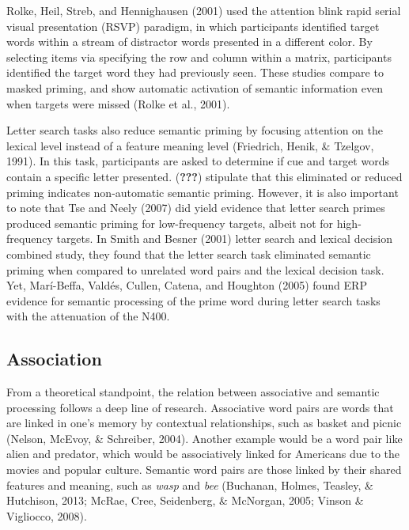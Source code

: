 \documentclass[english,man]{apa6}
\theoremstyle{definition}
\theoremstyle{definition}
\theoremstyle{definition}
\theoremstyle{remark}
\begin{document}
Rolke, Heil, Streb, and Hennighausen (2001) used the attention blink
rapid serial visual presentation (RSVP) paradigm, in which participants
identified target words within a stream of distractor words presented in
a different color. By selecting items via specifying the row and column
within a matrix, participants identified the target word they had
previously seen. These studies compare to masked priming, and show
automatic activation of semantic information even when targets were
missed (Rolke et al., 2001).

Letter search tasks also reduce semantic priming by focusing attention
on the lexical level instead of a feature meaning level (Friedrich,
Henik, \& Tzelgov, 1991). In this task, participants are asked to
determine if cue and target words contain a specific letter presented.
({\textbf{???}}) stipulate that this eliminated or reduced priming
indicates non-automatic semantic priming. However, it is also important
to note that Tse and Neely (2007) did yield evidence that letter search
primes produced semantic priming for low-frequency targets, albeit not
for high-frequency targets. In Smith and Besner (2001) letter search and
lexical decision combined study, they found that the letter search task
eliminated semantic priming when compared to unrelated word pairs and
the lexical decision task. Yet, Marí-Beffa, Valdés, Cullen, Catena, and
Houghton (2005) found ERP evidence for semantic processing of the prime
word during letter search tasks with the attenuation of the N400.

\subsection{Association}\label{association}

From a theoretical standpoint, the relation between associative and
semantic processing follows a deep line of research. Associative word
pairs are words that are linked in one's memory by contextual
relationships, such as basket and picnic (Nelson, McEvoy, \& Schreiber,
2004). Another example would be a word pair like alien and predator,
which would be associatively linked for Americans due to the movies and
popular culture. Semantic word pairs are those linked by their shared
features and meaning, such as \emph{wasp} and \emph{bee} (Buchanan,
Holmes, Teasley, \& Hutchison, 2013; McRae, Cree, Seidenberg, \&
McNorgan, 2005; Vinson \& Vigliocco, 2008).
\end{document}
